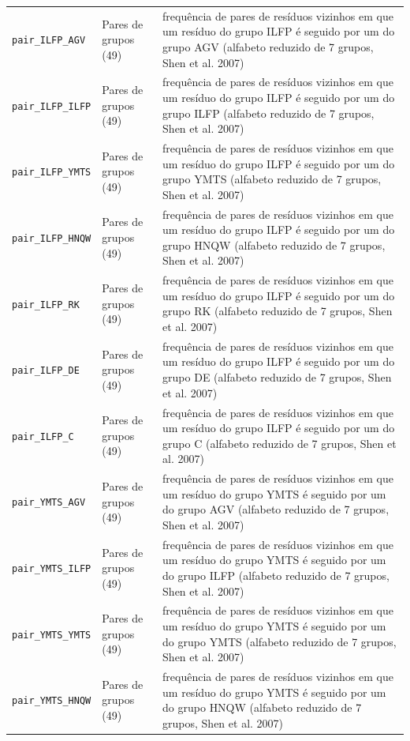 \begin{longtable}{p{4.2cm}p{2.6cm}p{8cm}}
  \texttt{pair\_ILFP\_AGV} & Pares de grupos (49) & frequência de pares de resíduos vizinhos em que um resíduo do grupo {ILFP} é seguido por um do grupo {AGV} (alfabeto reduzido de 7 grupos, Shen et al. 2007) \\
  \texttt{pair\_ILFP\_ILFP} & Pares de grupos (49) & frequência de pares de resíduos vizinhos em que um resíduo do grupo {ILFP} é seguido por um do grupo {ILFP} (alfabeto reduzido de 7 grupos, Shen et al. 2007) \\
  \texttt{pair\_ILFP\_YMTS} & Pares de grupos (49) & frequência de pares de resíduos vizinhos em que um resíduo do grupo {ILFP} é seguido por um do grupo {YMTS} (alfabeto reduzido de 7 grupos, Shen et al. 2007) \\
  \texttt{pair\_ILFP\_HNQW} & Pares de grupos (49) & frequência de pares de resíduos vizinhos em que um resíduo do grupo {ILFP} é seguido por um do grupo {HNQW} (alfabeto reduzido de 7 grupos, Shen et al. 2007) \\
  \texttt{pair\_ILFP\_RK} & Pares de grupos (49) & frequência de pares de resíduos vizinhos em que um resíduo do grupo {ILFP} é seguido por um do grupo {RK} (alfabeto reduzido de 7 grupos, Shen et al. 2007) \\
  \texttt{pair\_ILFP\_DE} & Pares de grupos (49) & frequência de pares de resíduos vizinhos em que um resíduo do grupo {ILFP} é seguido por um do grupo {DE} (alfabeto reduzido de 7 grupos, Shen et al. 2007) \\
  \texttt{pair\_ILFP\_C} & Pares de grupos (49) & frequência de pares de resíduos vizinhos em que um resíduo do grupo {ILFP} é seguido por um do grupo {C} (alfabeto reduzido de 7 grupos, Shen et al. 2007) \\
  \texttt{pair\_YMTS\_AGV} & Pares de grupos (49) & frequência de pares de resíduos vizinhos em que um resíduo do grupo {YMTS} é seguido por um do grupo {AGV} (alfabeto reduzido de 7 grupos, Shen et al. 2007) \\
  \texttt{pair\_YMTS\_ILFP} & Pares de grupos (49) & frequência de pares de resíduos vizinhos em que um resíduo do grupo {YMTS} é seguido por um do grupo {ILFP} (alfabeto reduzido de 7 grupos, Shen et al. 2007) \\
  \texttt{pair\_YMTS\_YMTS} & Pares de grupos (49) & frequência de pares de resíduos vizinhos em que um resíduo do grupo {YMTS} é seguido por um do grupo {YMTS} (alfabeto reduzido de 7 grupos, Shen et al. 2007) \\
  \texttt{pair\_YMTS\_HNQW} & Pares de grupos (49) & frequência de pares de resíduos vizinhos em que um resíduo do grupo {YMTS} é seguido por um do grupo {HNQW} (alfabeto reduzido de 7 grupos, Shen et al. 2007) \\

\end{longtable}
